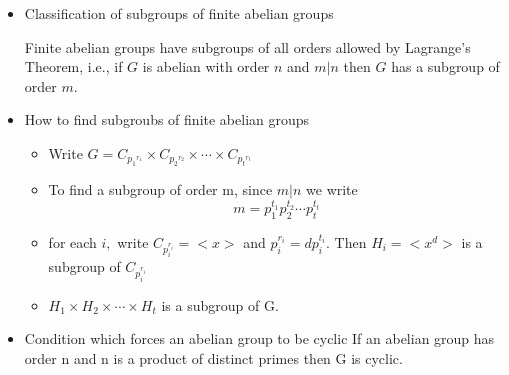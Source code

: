 \documentclass[a4paper, 12pt]
{article}
\begin{document}
\begin{itemize}
\begin{itemize}
		\item Multiply together the numbers occuring withing each column to form numbers $m_1, m_2, \cdots m_l.$
		
		\item Then $G \cong C_{m_1} \times C_{m_2} \times \cdots \times C_{m_l}$ and $m_i | m_{i+1}$ for all $i \in \{1, \cdots, l-1\}.$
	\end{itemize}
	
	\item Classification of subgroups of finite abelian groups
	
	Finite abelian groups have subgroups of all orders allowed by Lagrange's Theorem, i.e., if $G$ is abelian with order $n$ and $m|n$ then $G$ has a subgroup of order $m.$
	
	\item How to find subgroubs of finite abelian groups
	
	\begin{itemize}
		\item Write $G= C_{{p_1}^{r_1}} \times C_{{p_2}^{r_2}} \times \cdots \times C_{{p_t}^{r_t}}$
		
		\item To find a subgroup of order m, since $m|n$ we write 
		$$m= p_1^{t_1}p_2^{t_2} \cdots p_t^{t_t}$$
		\item for each $i,$ write $C_{p_i^{r_i}} = <x>$ and $p_i^{r_i} = dp_i^{t_i}.$ Then $H_i = <x^d>$ is a subgroup of $C_{p_i^{r_i}}$
		
		\item $H_1 \times H_2 \times \cdots \times H_t$ is a subgroup of G.
	\end{itemize}
	
	\item Condition which forces an abelian group to be cyclic If an abelian group has order n and n is a product of distinct primes then G is cyclic.
 	\end{itemize}
	
\hfill
\end{document}

